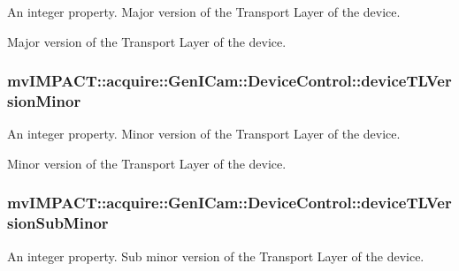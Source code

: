 An integer property. Major version of the Transport Layer of the device. 

Major version of the Transport Layer of the device. \hypertarget{classmv_i_m_p_a_c_t_1_1acquire_1_1_gen_i_cam_1_1_device_control_a73106e374d696420cc8818f0587765b6}{
\subsubsection[{device\+T\+L\+Version\+Minor}]{ mv\+I\+M\+P\+A\+C\+T\+::acquire\+::\+Gen\+I\+Cam\+::\+Device\+Control\+::device\+T\+L\+Version\+Minor}}\label{classmv_i_m_p_a_c_t_1_1acquire_1_1_gen_i_cam_1_1_device_control_a73106e374d696420cc8818f0587765b6}


An integer property. Minor version of the Transport Layer of the device. 

Minor version of the Transport Layer of the device. \hypertarget{classmv_i_m_p_a_c_t_1_1acquire_1_1_gen_i_cam_1_1_device_control_a24e14cdc73f997aab20a1220a0352938}{
\subsubsection[{device\+T\+L\+Version\+Sub\+Minor}]{ mv\+I\+M\+P\+A\+C\+T\+::acquire\+::\+Gen\+I\+Cam\+::\+Device\+Control\+::device\+T\+L\+Version\+Sub\+Minor}}\label{classmv_i_m_p_a_c_t_1_1acquire_1_1_gen_i_cam_1_1_device_control_a24e14cdc73f997aab20a1220a0352938}


An integer property. Sub minor version of the Transport Layer of the device. 

